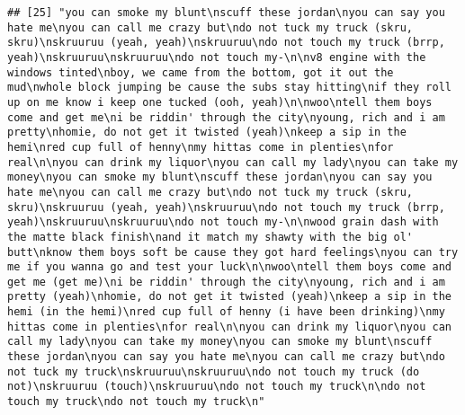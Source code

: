 \documentclass[]{article}
\begin{document}
\begin{verbatim}
## [25] "you can smoke my blunt\nscuff these jordan\nyou can say you hate me\nyou can call me crazy but\ndo not tuck my truck (skru, skru)\nskruuruu (yeah, yeah)\nskruuruu\ndo not touch my truck (brrp, yeah)\nskruuruu\nskruuruu\ndo not touch my-\n\nv8 engine with the windows tinted\nboy, we came from the bottom, got it out the mud\nwhole block jumping be cause the subs stay hitting\nif they roll up on me know i keep one tucked (ooh, yeah)\n\nwoo\ntell them boys come and get me\ni be riddin' through the city\nyoung, rich and i am pretty\nhomie, do not get it twisted (yeah)\nkeep a sip in the hemi\nred cup full of henny\nmy hittas come in plenties\nfor real\n\nyou can drink my liquor\nyou can call my lady\nyou can take my money\nyou can smoke my blunt\nscuff these jordan\nyou can say you hate me\nyou can call me crazy but\ndo not tuck my truck (skru, skru)\nskruuruu (yeah, yeah)\nskruuruu\ndo not touch my truck (brrp, yeah)\nskruuruu\nskruuruu\ndo not touch my-\n\nwood grain dash with the matte black finish\nand it match my shawty with the big ol' butt\nknow them boys soft be cause they got hard feelings\nyou can try me if you wanna go and test your luck\n\nwoo\ntell them boys come and get me (get me)\ni be riddin' through the city\nyoung, rich and i am pretty (yeah)\nhomie, do not get it twisted (yeah)\nkeep a sip in the hemi (in the hemi)\nred cup full of henny (i have been drinking)\nmy hittas come in plenties\nfor real\n\nyou can drink my liquor\nyou can call my lady\nyou can take my money\nyou can smoke my blunt\nscuff these jordan\nyou can say you hate me\nyou can call me crazy but\ndo not tuck my truck\nskruuruu\nskruuruu\ndo not touch my truck (do not)\nskruuruu (touch)\nskruuruu\ndo not touch my truck\n\ndo not touch my truck\ndo not touch my truck\n"                                                                                                                                                                                                                                                                                                                                                                                                                                                                                                                                                                                                                                                                                                                                                                                                                                                                                                                                                                                                                                                                                                                               

\end{verbatim}
\end{document}
